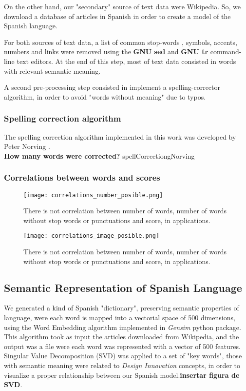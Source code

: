 On the other hand, our "secondary" source of text data were Wikipedia. So, we download a database of articles in Spanish \cite{wiki:Download} in order to create a model of the Spanish language. 

For both sources of text data, a list of common stop-words \cite{ranks:stopwords}, symbols, accents, numbers and links were removed using the \textbf{GNU sed} and \textbf{GNU tr}  command-line text editors. At the end of this step, most of text data consisted in words with relevant semantic meaning. 

A second pre-processing step consisted in implement a spelling-corrector algorithm, in order to avoid "words without meaning" due to typos.

\subsubsection{Spelling correction algorithm}
The spelling correction algorithm implemented in this work was developed by Peter Norving \cite{norvig2007write}. \\
\textbf{How many words were corrected?}
spellCorrectiongNorving

\subsubsection{Correlations between words and scores}
\begin{figure}[h]
	\label{fig:correlaciones_tabla}
	\texttt{[image: correlations\_number\_posible.png]}
    \caption{There is not correlation between number of words, number of words without stop words or punctuations and score, in applications.}
\end{figure}

\begin{figure}[h]
	\label{fig:correlaciones}
	\texttt{[image: correlations\_image\_posible.png]}
    \caption{There is not correlation between number of words, number of words without stop words or punctuations and score, in applications.}
\end{figure}

\subsection{Semantic Representation of Spanish Language}
	We generated a kind of Spanish "dictionary", preserving semantic properties of language, were each word is mapped into a vectorial space of 500 dimensions, using the Word Embedding algorithm implemented in \textit{Gensim} \cite{rehurek_lrec} python package.  This algorithm took as input the articles downloaded from Wikipedia, and the output was a file were each word was represented with a vector of 500 features. \\
	Singular Value Decomposition (SVD) was applied to a set of "key words", those with semantic meaning were related to \textit{Design Innovation} concepts, in order to visualize a proper relationship between our Spanish model.\textbf{insertar figura de SVD}.


